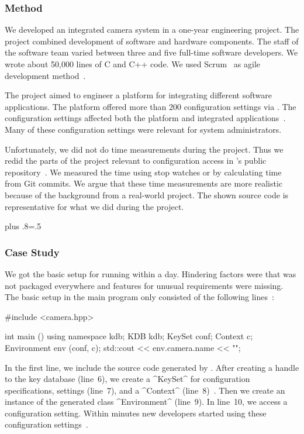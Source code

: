 \subsubsection{Method}

We developed an integrated camera system in a one-year engineering project.
The project combined development of software and hardware components.
The staff of the software team varied between three and five full-time software developers.
We wrote about 50,000 lines of C and C++ code.
We used Scrum~\cite{linda2000scrum} as agile development method~\cite{raab2015kps}.

The project aimed to engineer a platform for integrating different software applications.
The platform offered more than 200 configuration settings via \elektra{}.
The configuration settings affected both the platform and integrated applications~\cite{raab2015kps}.
Many of these configuration settings were relevant for system administrators.

Unfortunately, we did not do time measurements during the project.
Thus we redid the parts of the project relevant to configuration access in \elektra{}'s public repository~\cite{raab2015kps}.
We measured the time using stop watches or by calculating time from Git commits.
We argue that these time measurements are more realistic because of the background from a real-world project.
The shown source code is representative for what we did during the project.%
{\parfillskip=0pt plus .8\textwidth \emergencystretch=.5\textwidth \par}

\subsubsection{Case Study}

We got the basic setup for \elektra{} running within a day.
Hindering factors were that \elektra{} was not packaged everywhere and features for unusual requirements were missing.
The basic setup in the main program only consisted of the following lines~\cite{raab2015kps}:


\begin{code}[language=Cpp]
#include <camera.hpp>

int main ()
{
	using namespace kdb;
	KDB kdb;
	KeySet conf;
	Context c;
	Environment env (conf, c);
	std::cout << env.camera.name << "\n";
}
\end{code}


In the first line, we include the source code generated by .
After creating a handle to the key database (line~6), we create a ^KeySet^ for configuration specifications, settings (line~7), and a ^Context^ (line~8)~\cite{raab2014program}.
Then we create an instance of the generated class ^Environment^ (line~9).
In line~10, we access a configuration setting.
Within minutes new developers started using these configuration settings~\cite{raab2015kps}.

